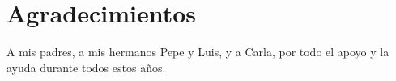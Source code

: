 
\thispagestyle{empty}

\chapter*{Agradecimientos}

A mis padres, a mis hermanos Pepe y Luis, y a Carla, por todo el apoyo y la ayuda durante todos estos años.

\cleardoublepage

